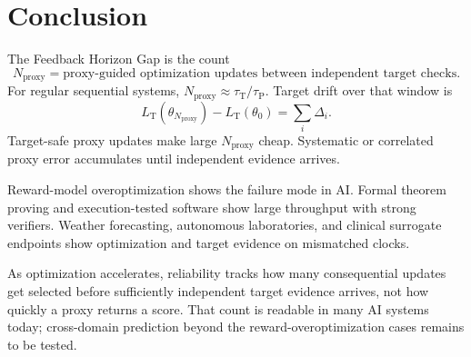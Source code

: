 \documentclass[11pt]{article}
\newcommand{\tauP}{\tau_{\mathrm{P}}}
\newcommand{\tauT}{\tau_{\mathrm{T}}}
\newcommand{\LT}{L_{\mathrm{T}}}
\newcommand{\Nproxy}{N_{\mathrm{proxy}}}
\begin{document}
\section{Conclusion}

The Feedback Horizon Gap is the count
\[
\Nproxy=
\text{proxy-guided optimization updates between independent target checks}.
\]
For regular sequential systems, \(\Nproxy\approx\tauT/\tauP\). Target drift over that window is
\[
\LT(\theta_{\Nproxy})-\LT(\theta_0)=\sum_i\Delta_i.
\]
Target-safe proxy updates make large \(\Nproxy\) cheap. Systematic or correlated proxy error accumulates until independent evidence arrives.

Reward-model overoptimization shows the failure mode in AI. Formal theorem proving and execution-tested software show large throughput with strong verifiers. Weather forecasting, autonomous laboratories, and clinical surrogate endpoints show optimization and target evidence on mismatched clocks.

As optimization accelerates, reliability tracks how many consequential updates get selected before sufficiently independent target evidence arrives, not how quickly a proxy returns a score. That count is readable in many AI systems today; cross-domain prediction beyond the reward-overoptimization cases remains to be tested.

\printbibliography
\end{document}
